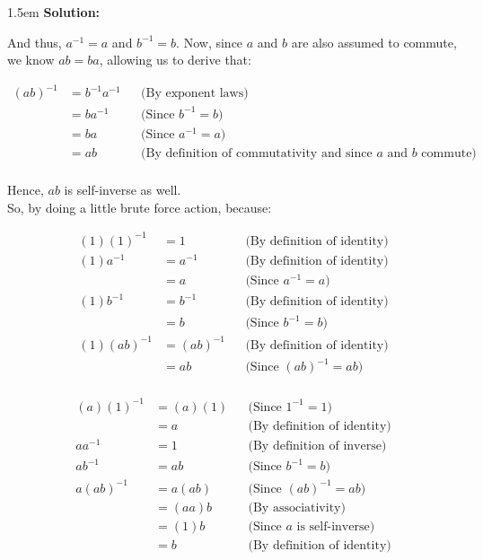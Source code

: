 \documentclass{article}
\newenvironment{solution}{
	\vspace{.5em}
	\par
	\begin{adjustwidth}{1.5em}{}
	\textbf{{Solution:}}
	\par
	\vspace{.5em}
}{
	\vspace{1em}
	\end{adjustwidth}
	\setcounter{step}{0}
	\newpage
}
\newcounter{step}
\begin{document}
\begin{solution}
	And thus, $a^{-1} = a$ and $b^{-1} = b$. Now, since $a$ and $b$ are also assumed to commute, we know $ab = ba$, allowing us to derive that:

	\begin{align*}
		(ab)^{-1} &= b^{-1}a^{-1} &&\text{(By exponent laws)} \\
		&= ba^{-1} &&\text{(Since $b^{-1} = b$)} \\
		&= ba &&\text{(Since $a^{-1} = a$)} \\
		&= ab &&\text{(By definition of commutativity and since $a$ and $b$ commute)} \\
	\end{align*}

	Hence, $ab$ is self-inverse as well. \\

	So, by doing a little brute force action, because:

	\begin{align*}
		(1)(1)^{-1} &= 1 &&\text{(By definition of identity)} \\
		(1)a^{-1} &= a^{-1} &&\text{(By definition of identity)} \\
		&= a &&\text{(Since $a^{-1} = a$)} \\
		(1)b^{-1} &= b^{-1} &&\text{(By definition of identity)} \\
		&= b &&\text{(Since $b^{-1} = b$)} \\
		(1)(ab)^{-1} &= (ab)^{-1} &&\text{(By definition of identity)} \\
		&= ab &&\text{(Since $(ab)^{-1} = ab$)} \\
	\end{align*}

	\begin{align*}
		(a)(1)^{-1} &= (a)(1) &&\text{(Since $1^{-1} = 1$)} \\
		&= a &&\text{(By definition of identity)} \\
		aa^{-1} &= 1 &&\text{(By definition of inverse)} \\
		ab^{-1} &= ab &&\text{(Since $b^{-1} = b$)} \\
		a(ab)^{-1} &= a(ab) &&\text{(Since $(ab)^{-1} = ab$)} \\
		&= (aa)b &&\text{(By associativity)} \\
		&= (1)b &&\text{(Since $a$ is self-inverse)} \\
		&= b &&\text{(By definition of identity)} \\
	\end{align*}


\end{solution}
\end{document}
